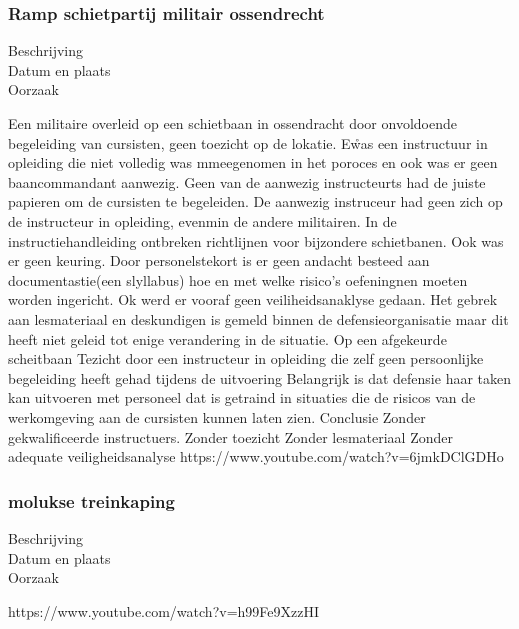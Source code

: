 \subsubsection{Ramp schietpartij militair ossendrecht }

	\begin{description}
	\item[Beschrijving]
	\item[Datum en plaats] 
	\item[Oorzaak]
\end{description}
Een militaire overleid op een schietbaan in ossendracht door onvoldoende begeleiding van cursisten, geen toezicht op de lokatie. E\r was een instructuur in opleiding die niet volledig was mmeegenomen in het poroces en ook was er geen baancommandant aanwezig. Geen van de aanwezig instructeurts had de juiste papieren om de cursisten te begeleiden. De aanwezig instruceur had geen zich op de instructeur in opleiding, evenmin de andere militairen. In de instructiehandleiding ontbreken richtlijnen voor bijzondere schietbanen. Ook was er geen keuring. Door personelstekort is er geen andacht besteed aan documentastie(een slyllabus) hoe en met welke risico’s oefeningnen moeten worden ingericht. Ok werd er vooraf geen veiliheidsanaklyse gedaan. Het gebrek aan lesmateriaal en deskundigen is gemeld binnen de defensieorganisatie maar dit heeft niet geleid tot enige verandering in de situatie.
Op een afgekeurde scheitbaan
Tezicht door een instructeur in opleiding die zelf geen persoonlijke begeleiding heeft gehad tijdens de uitvoering
Belangrijk is dat defensie haar taken kan uitvoeren met personeel dat is getraind in situaties die de risicos van de werkomgeving aan de cursisten kunnen laten zien.
Conclusie
Zonder gekwalificeerde instructuers.
Zonder toezicht
Zonder lesmateriaal
Zonder adequate veiligheidsanalyse
https://www.youtube.com/watch?v=6jmkDClGDHo 




\subsubsection{molukse treinkaping }

	\begin{description}
	\item[Beschrijving]
	\item[Datum en plaats] 
	\item[Oorzaak]
\end{description}
https://www.youtube.com/watch?v=h99Fe9XzzHI 

